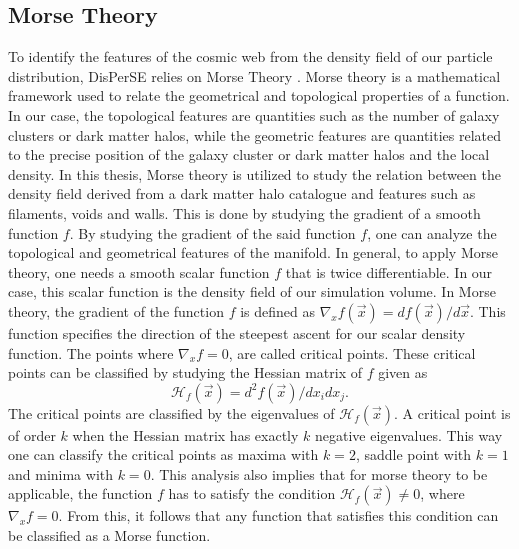 \subsection{Morse Theory}
To identify the features of the cosmic web from the density field of our
particle distribution, DisPerSE relies on Morse Theory \cite{Morse}. Morse
theory is a mathematical framework used to relate the geometrical and
topological properties of a function. In our case, the topological features are quantities such as the number of galaxy clusters or dark matter halos, while the geometric features are quantities related to the precise position of the galaxy cluster or dark matter halos and the local density. In this thesis, Morse theory is utilized to
study the relation between the density field derived from a dark matter halo catalogue and features such as
filaments, voids and walls.
This is done by studying the gradient of a smooth function $f$. By studying the
gradient of the said function $f$, one can analyze the topological and geometrical features of
the manifold. In general, to apply Morse theory, one needs a smooth scalar function $f$
that is twice differentiable. In our case, this scalar function is the density
field of our simulation volume. In Morse theory, the gradient of the function $f$
is defined as $\nabla_xf(\vec{x})=df(\vec{x})/d\vec{x}$. This function
specifies the direction of the steepest ascent for our scalar density function. The
points where $\nabla_xf=0$, are called critical points. These critical
points can be classified by studying the Hessian matrix of $f$ given as
\begin{equation}
    \mathcal{H}_f(\vec{x})=d^2f(\vec{x})/dx_idx_j.
\end{equation}
The critical points are classified by the eigenvalues of $\mathcal{H}_f(\vec{x})$. A critical point is of order $k$ when the Hessian matrix has exactly $k$
negative eigenvalues. This way one can classify the critical points as maxima
with $k=2$, saddle point with $k=1$ and minima with $k=0$. This analysis also
implies that for morse theory to be applicable, the function $f$ has to satisfy
the condition $\mathcal{H}_f(\vec{x})\neq 0$, where $\nabla_xf=0$. From this, it
follows that any function that satisfies this condition can be classified as a Morse
function.\\
 
